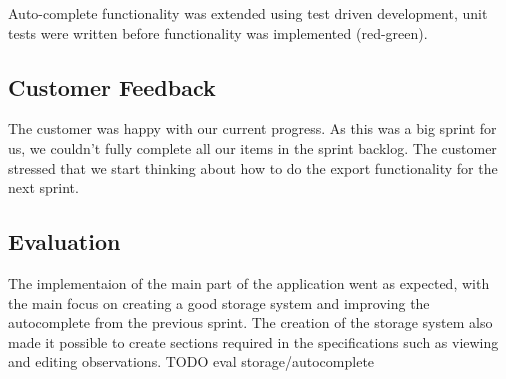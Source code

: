 Auto-complete functionality was extended using test driven development, unit
tests were written before functionality was implemented (red-green).

\subsection{Customer Feedback}
The customer was happy with our current progress. As this was a big sprint for
us, we couldn't fully complete all our items in the sprint backlog. The customer
stressed that we start thinking about how to do the export functionality for the
next sprint.

\subsection{Evaluation}
The implementaion of the main part of the application went as expected, with the
main focus on creating a good storage system and improving the autocomplete from
the previous sprint. The creation of the storage system also made it possible to
create sections required in the specifications such as viewing and editing
observations.
TODO eval storage/autocomplete
